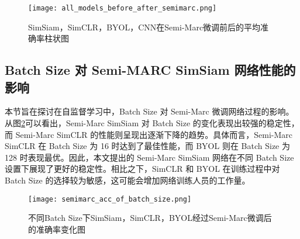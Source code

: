 \documentclass[master]{thesis-uestc}
\begin{document}
\begin{figure}[h]
    \centering
    \texttt{[image: all\_models\_before\_after\_semimarc.png]}
    \caption{SimSiam，SimCLR，BYOL，CNN在Semi-Marc微调前后的平均准确率柱状图}
    \label{all_models_before_after_semimarc}
\end{figure}

\subsection{Batch Size 对 Semi-MARC SimSiam 网络性能的影响}
本节旨在探讨在自监督学习中，Batch Size 对 Semi-Marc 微调网络过程的影响。从图\ref{semimarc_acc_of_batch_size}可以看出，Semi-Marc SimSiam 对 Batch Size 的变化表现出较强的稳定性，而 Semi-Marc SimCLR 的性能则呈现出逐渐下降的趋势。具体而言，Semi-Marc SimCLR 在 Batch Size 为 16 时达到了最佳性能，而 BYOL 则在 Batch Size 为 128 时表现最优。因此，本文提出的 Semi-Marc SimSiam 网络在不同 Batch Size 设置下展现了更好的稳定性。相比之下，SimCLR 和 BYOL 在训练过程中对 Batch Size 的选择较为敏感，这可能会增加网络训练人员的工作量。

\begin{figure}[h]
    \centering
    \texttt{[image: semimarc\_acc\_of\_batch\_size.png]}
    \caption{不同Batch Size下SimSiam，SimCLR，BYOL经过Semi-Marc微调后的准确率变化图}
    \label{semimarc_acc_of_batch_size}
\end{figure}

\end{document}
